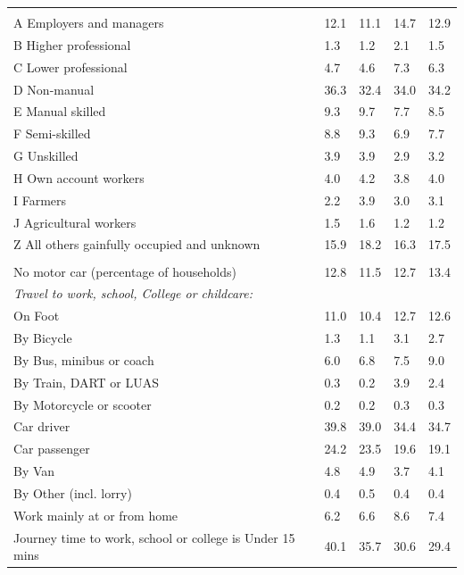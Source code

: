 \documentclass{article}
\begin{document}
\begin{table}[h]
\begin{tabular}{KTTTT}
\hline
    \\ 
    \hline
A Employers and managers & 12.1& 11.1& 14.7& 12.9\\
B Higher professional & 1.3& 1.2& 2.1& 1.5\\
C Lower professional & 4.7& 4.6& 7.3& 6.3\\
D Non-manual & 36.3& 32.4& 34.0& 34.2\\
E Manual skilled & 9.3& 9.7& 7.7& 8.5\\
F Semi-skilled & 8.8& 9.3& 6.9& 7.7\\
G Unskilled & 3.9& 3.9& 2.9& 3.2\\
H Own account workers & 4.0& 4.2& 3.8& 4.0\\
I Farmers & 2.2& 3.9& 3.0& 3.1\\
J Agricultural workers & 1.5& 1.6& 1.2& 1.2\\
Z All others gainfully occupied and unknown & 15.9& 18.2& 16.3& 17.5\\
\hline
{}\hline
    \\ 
    \hline
No motor car (percentage of households) & 12.8& 11.5& 12.7& 
13.4\\
    \hline 
\emph{Travel to work, school, College or childcare:} & & & \\
\quad On Foot & 11.0& 10.4& 12.7& 12.6\\ 
\quad By Bicycle & 1.3& 1.1& 3.1& 2.7\\ 
\quad By Bus, minibus or coach & 6.0& 6.8& 7.5& 9.0\\
\quad By Train, DART or LUAS & 0.3& 0.2& 3.9& 2.4\\
\quad By Motorcycle or scooter & 0.2& 0.2& 0.3& 0.3\\
\quad Car driver & 39.8 & 39.0& 34.4& 34.7\\
\quad Car passenger & 24.2& 23.5& 19.6& 19.1\\
\quad By Van & 4.8& 4.9& 3.7& 4.1\\
\quad By Other (incl. lorry) & 0.4& 0.5& 0.4& 0.4\\
    \hline
Work mainly at or from home & 6.2& 6.6& 8.6& 7.4\\
Journey time to work, school or college is Under 15 mins & 40.1& 35.7& 30.6& 29.4\\

\end{tabular}
\end{table}
\end{document}
